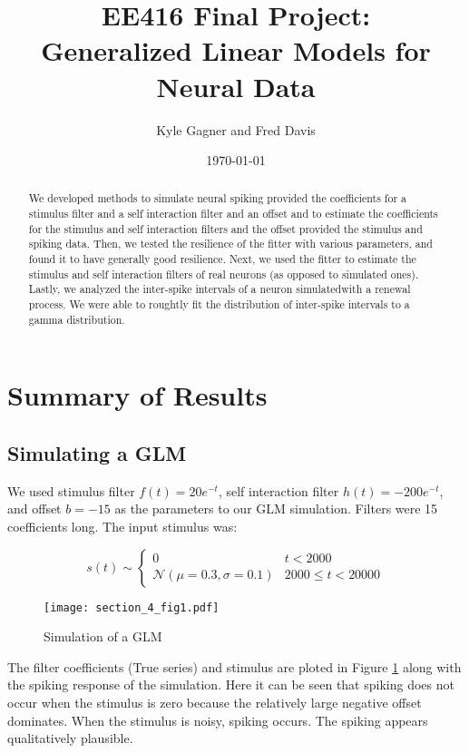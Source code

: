 \documentclass[letterpaper,titlepage,10pt]{article}
\title{EE416 Final Project:\\Generalized Linear Models for Neural Data}
\date{\today}
\author{Kyle Gagner and Fred Davis}
\begin{document}
\maketitle

\begin{abstract}

We developed methods to simulate neural spiking provided the coefficients for a stimulus filter and a self
interaction filter and an offset and to estimate the coefficients for the stimulus and self interaction
filters and the offset provided the stimulus and spiking data. Then, we tested the resilience of the fitter
with various parameters, and found it to have generally good resilience. Next, we used the fitter to estimate
the stimulus and self interaction filters of real neurons (as opposed to simulated ones). Lastly, we analyzed
the inter-spike intervals of a neuron simulatedwith a renewal process. We were able to roughtly fit the
distribution of inter-spike intervals to a gamma distribution.

\end{abstract}

\section{Summary of Results}

\subsection{Simulating a GLM}

We used stimulus filter $f(t)=20e^{-t}$, self interaction filter $h(t)=-200e^{-t}$, and offset $b=-15$ as the
parameters to our GLM simulation. Filters were 15 coefficients long. The input stimulus was:

$$s(t)\sim
\begin{cases}
0 & t < 2000\\
\mathcal{N}(\mu=0.3, \sigma=0.1) & 2000 \leq t < 20000
\end{cases}$$

\begin{figure}[h]
\texttt{[image: section\_4\_fig1.pdf]}
\caption{Simulation of a GLM}
\label{fig41}
\end{figure}

The filter coefficients (True series) and stimulus are ploted in Figure \ref{fig41} along with the spiking
response of the simulation. Here it can be seen that spiking does not occur when the stimulus is zero because the
relatively large negative offset dominates. When the stimulus is noisy, spiking occurs. The spiking appears
qualitatively plausible.
\end{document}
